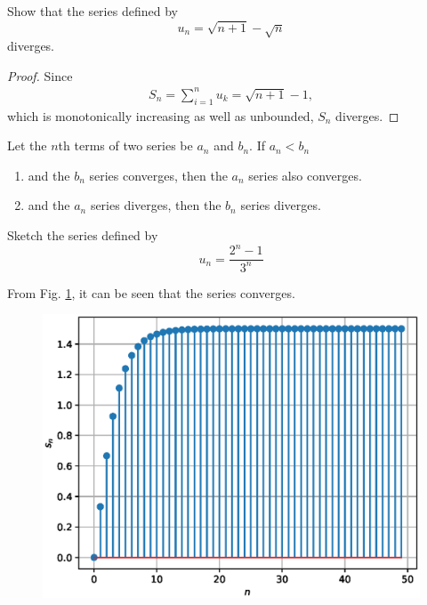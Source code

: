 \documentclass[journal,12pt,twocolumn]{IEEEtran}
\begin{document}
\begin{problem}
Show that the series defined by 
\begin{equation}
u_{n}=\sqrt{n+1}-\sqrt{n}
\end{equation}
diverges.
\end{problem}
\begin{proof}
Since
\begin{align}
S_n = \sum_{i=1}^{n}u_k = \sqrt{n+1}-1,
\end{align}
which is monotonically increasing as well as unbounded, $S_n$ diverges.
\end{proof}
%
\begin{proposition}
\label{prop:inequality}
Let the $n$th terms of two series be $a_n$ and $b_n$.  If $a_n < b_n$
\begin{enumerate}
\item  and the $b_n$ series converges, then the $a_n$ series also converges.
\item  and the $a_n$ series diverges, then the $b_n$ series diverges.
\end{enumerate}
\end{proposition}
\begin{problem}
\label{prob:inequality}
Sketch the series defined by 
\begin{equation}
u_{n}=\frac{2^n-1}{3^n}
\end{equation}
\end{problem}
%
\solution From Fig. \ref{fig:5}, it can be seen that the series converges.
%

%
\begin{figure}[!ht]
\begin{center}
\includegraphics[width=\columnwidth]{./figs/5.eps}
\end{center}
\label{fig:5}	
\end{figure}
\end{document}
